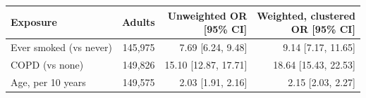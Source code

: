 \begin{tabular}{lrrr}
\toprule
Exposure & Adults & \makecell[b]{Unweighted OR\\{}[95\% CI]} & \makecell[b]{Weighted, clustered\\{}OR [95\% CI]} \\
\midrule
Ever smoked (vs never) & 145,975 & 7.69 [6.24, 9.48] & 9.14 [7.17, 11.65] \\
COPD (vs none) & 149,826 & 15.10 [12.87, 17.71] & 18.64 [15.43, 22.53] \\
Age, per 10 years & 149,575 & 2.03 [1.91, 2.16] & 2.15 [2.03, 2.27] \\
\bottomrule
\end{tabular}
